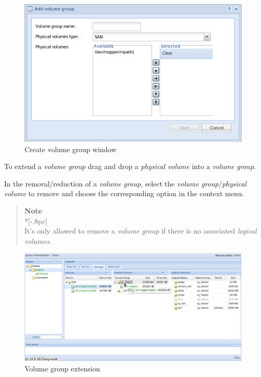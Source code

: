 \begin{figure}[H]
        \begin{center}
        \includegraphics[scale=0.5]{screenshots/storage_vg_create.png}
        \caption{Create volume group window}
        \label{fig:storage_vg_create}
        \end{center}
\end{figure}

To extend a \emph{volume group} drag and drop a \emph{physical volume} into a \emph{volume group}.

In the removal/reduction of a \emph{volume group}, select the \emph{volume group}/\emph{physical volume} to remove and choose the corresponding option in the context menu.

\begin{quote}
	{\large \bf Note} \\*[-.8pc]
	\underline{\hspace{6in}} \\
    It's only allowed to remove a \emph{volume group} if there is no associated \emph{logical volumes}.
\end{quote}
 
\begin{figure}[H]
        \begin{center}
        \includegraphics[scale=0.45]{screenshots/storage_vg_extend.png}
        \caption{Volume group extension}
        \label{fig:storage_vg_extend}
        \end{center}
\end{figure}

